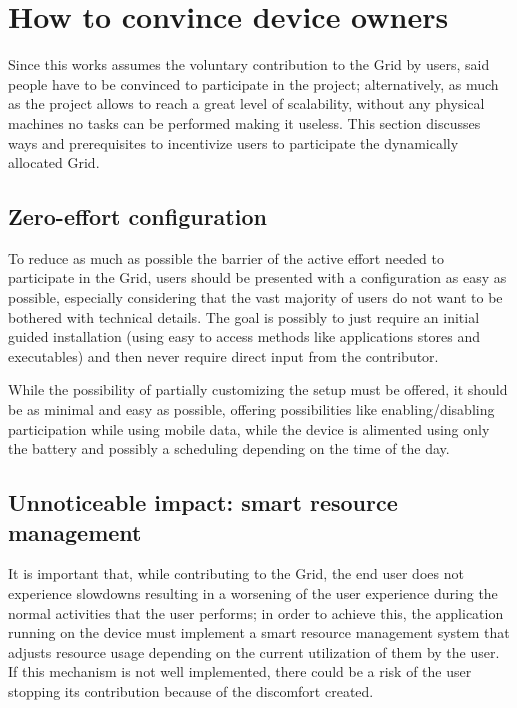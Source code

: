 \section{How to convince device owners}
Since this works assumes the voluntary contribution to the Grid by users, said people have to be convinced to participate in the project; alternatively, as much as the project allows to reach a great level of scalability, without any physical machines no tasks can be performed making it useless. This section discusses ways and prerequisites to incentivize users to participate the dynamically allocated Grid.

\subsection{Zero-effort configuration}
To reduce as much as possible the barrier of the active effort needed to participate in the Grid, users should be presented with a configuration as easy as possible, especially considering that the vast majority of users do not want to be bothered with technical details. The goal is possibly to just require an initial guided installation (using easy to access methods like applications stores and executables) and then never require direct input from the contributor.

While the possibility of partially customizing the setup must be offered, it should be as minimal and easy as possible, offering possibilities like enabling/disabling participation while using mobile data, while the device is alimented using only the battery and possibly a scheduling depending on the time of the day. 

\subsection{Unnoticeable impact: smart resource management}
It is important that, while contributing to the Grid, the end user does not experience slowdowns resulting in a worsening of the user experience during the normal activities that the user performs; in order to achieve this, the application running on the device must implement a smart resource management system that adjusts resource usage depending on the current utilization of them by the user. If this mechanism is not well implemented, there could be a risk of the user stopping its contribution because of the discomfort created.

